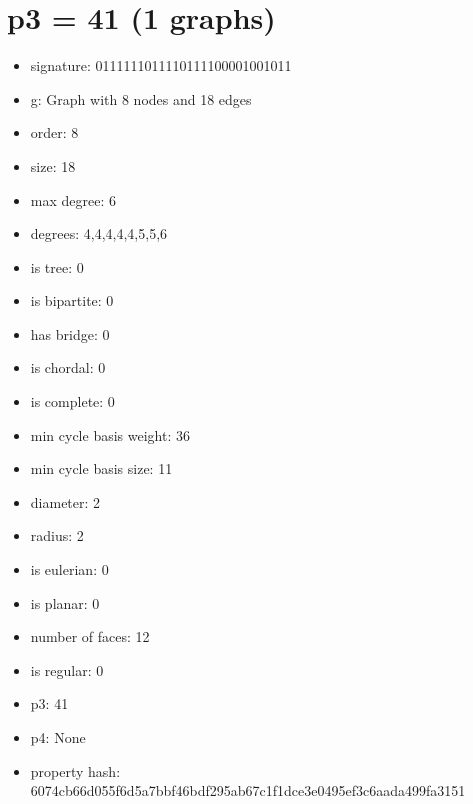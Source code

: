 \chapter{p3 = 41 (1 graphs)}
\newpage\begin{figure}
\end{figure}
\begin{itemize}
\item signature: 0111111011110111100001001011
\item g: Graph with 8 nodes and 18 edges
\item order: 8
\item size: 18
\item max degree: 6
\item degrees: 4,4,4,4,4,5,5,6
\item is tree: 0
\item is bipartite: 0
\item has bridge: 0
\item is chordal: 0
\item is complete: 0
\item min cycle basis weight: 36
\item min cycle basis size: 11
\item diameter: 2
\item radius: 2
\item is eulerian: 0
\item is planar: 0
\item number of faces: 12
\item is regular: 0
\item p3: 41
\item p4: None
\item property hash: 6074cb66d055f6d5a7bbf46bdf295ab67c1f1dce3e0495ef3c6aada499fa3151
\end{itemize}
\newpage
